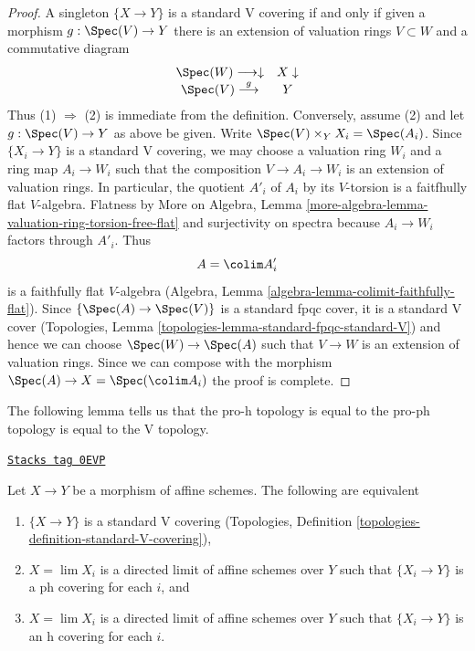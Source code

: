 \begin{proof}
A singleton $\{X \to Y\}$ is a standard V covering if and only if
given a morphism $g : \Spec(V) \to Y$ there is an extension of
valuation rings $V \subset W$ and a commutative diagram
$$
\begin{array}{cc}\Spec(W) \longrightarrow\downarrow & X \downarrow \\ \Spec(V) \overset{g}{\longrightarrow} & Y\end{array}
$$
Thus (1) $\Rightarrow$ (2) is immediate from the definition.
Conversely, assume (2) and let $g : \Spec(V) \to Y$ as above
be given. Write $\Spec(V) \times_Y X_i = \Spec(A_i)$.
Since $\{X_i \to Y\}$ is a standard V covering, we may choose
a valuation ring $W_i$ and a ring map $A_i \to W_i$ such that
the composition $V \to A_i \to W_i$ is an extension of valuation
rings. In particular, the quotient $A'_i$ of $A_i$ by its
$V$-torsion is a faitfhully flat $V$-algebra. Flatness by
More on Algebra, Lemma
\ref{more-algebra-lemma-valuation-ring-torsion-free-flat} and
surjectivity on spectra because $A_i \to W_i$ factors through $A'_i$.
Thus
$$
A = \colim A'_i
$$
is a faithfully flat $V$-algebra
(Algebra, Lemma \ref{algebra-lemma-colimit-faithfully-flat}).
Since $\{\Spec(A) \to \Spec(V)\}$ is a standard fpqc cover, it
is a standard V cover
(Topologies, Lemma \ref{topologies-lemma-standard-fpqc-standard-V})
and hence we can choose $\Spec(W) \to \Spec(A)$ such that
$V \to W$ is an extension of valuation rings. Since we can compose
with the morphism $\Spec(A) \to X = \Spec(\colim A_i)$
the proof is complete.
\end{proof}

The following lemma tells us that the pro-h topology is equal to the
pro-ph topology is equal to the V topology.

\begin{lemma}[Pro h V]
\label{proetale-lemma-pro-h-V}
\href{https://stacks.math.columbia.edu/tag/0EVP}{\texttt{Stacks tag 0EVP}}

Let $X \to Y$ be a morphism of affine schemes. The following are equivalent
\begin{enumerate}
\item $\{X \to Y\}$ is a standard V covering
(Topologies, Definition \ref{topologies-definition-standard-V-covering}),
\item $X = \lim X_i$ is a directed limit of affine schemes over $Y$
such that $\{X_i \to Y\}$ is a ph covering for each $i$, and
\item $X = \lim X_i$ is a directed limit of affine schemes over $Y$
such that $\{X_i \to Y\}$ is an h covering for each $i$.
\end{enumerate}
\end{lemma}

